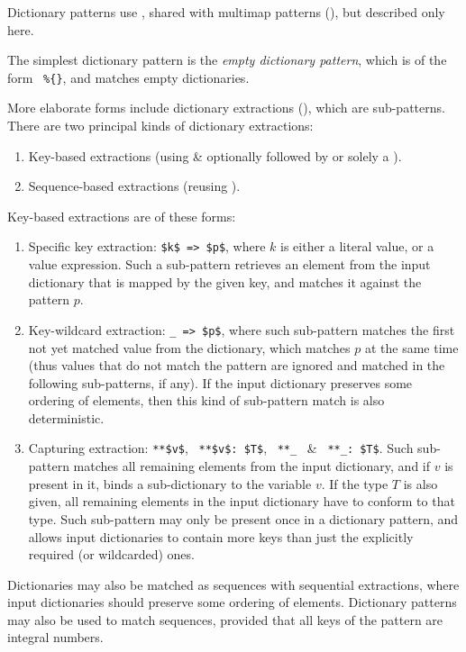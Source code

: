 Dictionary patterns use , shared with multimap patterns (), but described only here. 

The simplest dictionary pattern is the {\em empty dictionary pattern}, which is of the form ~\lstinline!%{}!, and matches empty dictionaries. 

More elaborate forms include dictionary extractions (), which are sub-patterns. There are two principal kinds of dictionary extractions:
\begin{enumerate}
  \item Key-based extractions (using  \& optionally followed by or solely a ). 
  \item Sequence-based extractions (reusing ). 
\end{enumerate}

Key-based extractions are of these forms:
\begin{enumerate}
  \item Specific key extraction: \lstinline!$k$ => $p$!, where $k$ is either a literal value, or a value expression. Such a sub-pattern retrieves an element from the input dictionary that is mapped by the given key, and matches it against the pattern $p$. 
  \item Key-wildcard extraction: \lstinline!_ => $p$!, where such sub-pattern matches the first not yet matched value from the dictionary, which matches $p$ at the same time (thus values that do not match the pattern are ignored and matched in the following sub-patterns, if any). If the input dictionary preserves some ordering of elements, then this kind of sub-pattern match is also deterministic. 
  \item Capturing extraction: \lstinline!**$v$!, ~\lstinline!**$v$: $T$!, ~\lstinline!**_!~ \& ~\lstinline!**_: $T$!. Such sub-pattern matches all remaining elements from the input dictionary, and if $v$ is present in it, binds a sub-dictionary to the variable $v$. If the type $T$ is also given, all remaining elements in the input dictionary have to conform to that type. Such sub-pattern may only be present once in a dictionary pattern, and allows input dictionaries to contain more keys than just the explicitly required (or wildcarded) ones. 
\end{enumerate}

Dictionaries may also be matched as sequences with sequential extractions, where input dictionaries should preserve some ordering of elements. Dictionary patterns may also be used to match sequences, provided that all keys of the pattern are integral numbers. 

